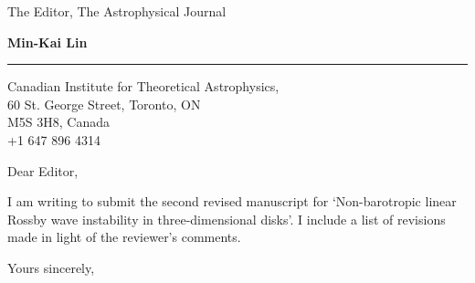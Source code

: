 \documentclass{letter} %
\begin{document}
\signature{Min-Kai Lin}           %
\longindentation=0pt                       %
\let\raggedleft\raggedright                %
 
 
\begin{letter}{The Editor, The Astrophysical Journal}


\begin{flushleft}
{\large\bf Min-Kai Lin}
\end{flushleft}
\medskip\hrule height 1pt
\begin{flushright}
\hfill Canadian Institute for Theoretical Astrophysics, \\
\hfill 60 St. George Street, Toronto, ON \\
\hfill M5S 3H8, Canada\\
\hfill +1 647 896 4314
\end{flushright} 
\vfill %

 
\opening{Dear Editor,} 
 
I am writing to submit the second revised manuscript for `Non-barotropic linear Rossby wave instability
in three-dimensional disks'. I include a list of revisions made in light of the reviewer's comments. 

\closing{Yours sincerely,} 
 
 

\end{letter}
 
\end{document}
